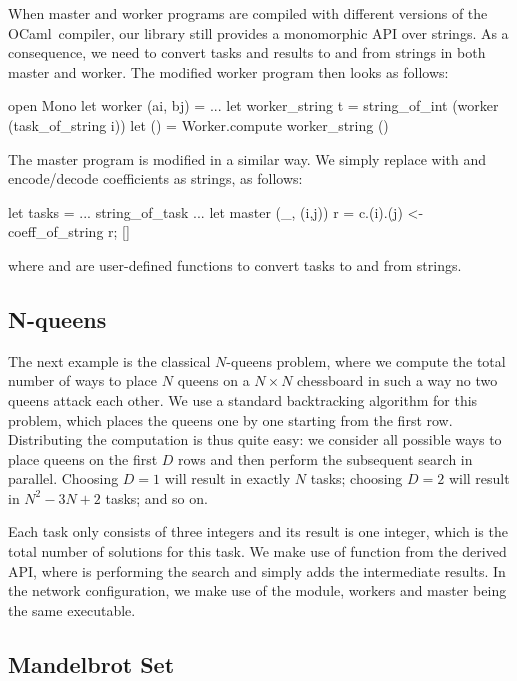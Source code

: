 \documentclass[a4paper,12pt]{article}
\newcommand{\Ocaml}{OCaml}
\begin{document}
When master and worker programs are compiled with different
versions of the \Ocaml\ compiler, our library still provides
a monomorphic API over strings. As a consequence, we need to convert
tasks and results to and from strings in both master and worker.
The modified worker program then looks as follows:
\begin{ocaml}
  open Mono
  let worker (ai, bj) = ...
  let worker_string t = string_of_int (worker (task_of_string i))
  let () = Worker.compute worker_string ()
\end{ocaml}
The master program is modified in a similar way.
We simply replace  with  and encode/decode coefficients
as strings, as follows:
\begin{ocaml}
  let tasks = ... string_of_task ...
  let master (_, (i,j)) r = c.(i).(j) <- coeff_of_string r; []
\end{ocaml}
where  and  are user-defined
functions to convert tasks to and from strings.

\subsection{N-queens}\label{sec:n-queens}

The next example is the classical $N$-queens problem, where we
compute the total number of ways to place $N$ queens on a $N\times N$
chessboard in such a way no two queens attack each other.
We use a standard backtracking algorithm for this problem, which
places the queens one by one starting from the first row.
Distributing the computation is thus quite easy: we consider all
possible ways to place queens on the first $D$ rows and then perform
the subsequent search in parallel. Choosing $D=1$ will result in
exactly $N$ tasks; choosing $D=2$ will result in $N^2-3N+2$ tasks; and
so on.

Each task only consists of three integers and its result is one integer,
which is the total number of solutions for this task.
We make use of function  from the derived API,
where  is performing the search and  simply adds the
intermediate results.
In the network configuration, we make use of the 
module, workers and master being the same executable.

\subsection{Mandelbrot Set}
\end{document}
